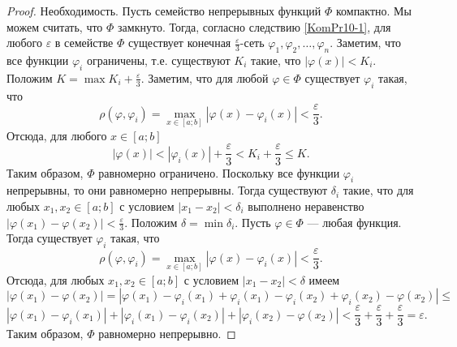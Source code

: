 \documentclass[12pt, titlepage, oneside]{amsbook}
\theoremstyle{definition}
\theoremstyle{remark}
\begin{document}
\begin{proof}
	Необходимость. Пусть семейство непрерывных функций $\Phi$ компактно. Мы можем считать, что $\Phi$ замкнуто. Тогда, согласно следствию \ref{KomPr10-1}, для любого $\varepsilon$ в семействе $\Phi$ существует конечная $\frac{\varepsilon}{3}$-сеть $\varphi_1,\varphi_2,\ldots,\varphi_n$. Заметим, что все функции $\varphi_i$ ограничены, т.е. существуют $K_i$ такие, что $|\varphi(x)|<K_i$. Положим $K=\max K_i+\frac{\varepsilon}{3}$. Заметим, что для любой $\varphi\in\Phi$ существует $\varphi_i$ такая, что $$\rho(\varphi,\varphi_i)=\max\limits_{x\in[a;b]}|\varphi(x)-\varphi_i(x)|<\frac{\varepsilon}{3}.$$ Отсюда, для любого $x\in[a;b]$ $$|\varphi(x)|<|\varphi_i(x)|+\frac{\varepsilon}{3}<K_i+\frac{\varepsilon}{3}\leq K.$$ Таким образом, $\Phi$ равномерно ограничено. Поскольку все функции $\varphi_i$ непрерывны, то они равномерно непрерывны. Тогда существуют $\delta_i$ такие, что для любых $x_1,x_2\in[a;b]$ с условием $|x_1-x_2|<\delta_i$ выполнено неравенство $|\varphi(x_1)-\varphi(x_2)|<\frac{\varepsilon}{3}$. Положим $\delta=\min\delta_i$. Пусть $\varphi\in\Phi$ --- любая функция. Тогда существует $\varphi_i$ такая, что $$\rho(\varphi,\varphi_i)=\max\limits_{x\in[a;b]}|\varphi(x)-\varphi_i(x)|<\frac{\varepsilon}{3}.$$ Отсюда, для любых $x_1,x_2\in[a;b]$ с условием $|x_1-x_2|<\delta$ имеем $$|\varphi(x_1)-\varphi(x_2)|=|\varphi(x_1)-\varphi_i(x_1)+\varphi_i(x_1)-\varphi_i(x_2)+\varphi_i(x_2)-\varphi(x_2)|\leq$$ $$|\varphi(x_1)-\varphi_i(x_1)|+|\varphi_i(x_1)-\varphi_i(x_2)|+|\varphi_i(x_2)-\varphi(x_2)|<\frac{\varepsilon}{3}+\frac{\varepsilon}{3}+\frac{\varepsilon}{3}=\varepsilon.$$ Таким образом, $\Phi$ равномерно непрерывно.
	

\end{proof}
\end{document}
